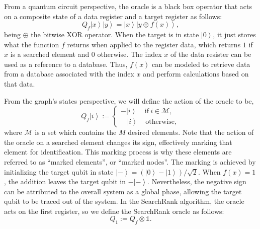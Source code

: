 \documentclass[nofootinbib,aps,prd,reprint,superscriptaddress,floatfix]{revtex4-2}
\begin{document}
From a quantum circuit perspective, the oracle is a black box operator that acts on a composite state of a data register and a target register as follows:
\begin{equation}\label{eq:oracle_circuit}
    Q_{f}\left|x\right>\left|y\right>=\left|x\right>\left|y \oplus f(x)\right>,
\end{equation}
being $\oplus$ the bitwise XOR operator. When the target is in state $\left|0\right>$, it just stores what the function $f$ returns when applied to the register data, which returns $1$ if $x$ is a searched element and $0$ otherwise. The index $x$ of the data resister can be used as a reference to a database. Thus, $f(x)$ can be modeled to retrieve data from a database associated with the index $x$ and perform calculations based on that data. 

From the graph's states perspective, we will define the action of the oracle to be,
\begin{equation}\label{eq:oracle_graph}
	Q_{f}\left|i\right> := 
	\left\lbrace\begin{array}{c}
		-\left|i\right> \ \ \ \ \ \text{if} \ i \in \mathcal{M},\\
		\ \ \ \ \left|i\right> \ \ \ \ \    \text{otherwise},
	\end{array}
	\right.
\end{equation}
where $\mathcal{M}$ is a set which contains the $M$ desired elements. Note that the action of the oracle on a searched element changes its sign, effectively marking that element for identification. This marking process is why these elements are referred to as ``marked elements'', or ``marked nodes''. The marking is achieved by initializing the target qubit in state $\left|-\right> = (\left|0\right>-\left|1\right>)/\sqrt{2}$. When $f(x)=1$, the addition leaves the target qubit in $-\left|-\right>$. Nevertheless, the negative sign can be attributed to the overall system as a global phase, allowing the target qubit to be traced out of the system. In the SearchRank algorithm, the oracle acts on the first register, so we define the SearchRank oracle as follows:
\begin{equation}
    Q_{1}:=Q_f \otimes \mathds{1}.
\end{equation}
\end{document}
